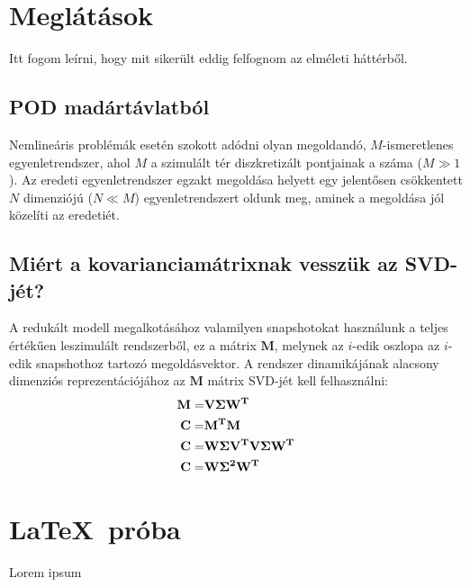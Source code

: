 \author{Szilágyi Gábor \\\vspace{2cm}\\ Konzulens: Dr. Bilicz Sándor}
\date{Budapest, \today}



    \maketitle
    \tableofcontents
    \section{Meglátások}
        Itt fogom leírni, hogy mit sikerült eddig felfognom az elméleti háttérből.
        \subsection{POD madártávlatból}
            Nemlineáris problémák esetén szokott adódni olyan megoldandó, $M$-ismeretlenes egyenletrendszer, ahol $M$ a szimulált tér diszkretizált pontjainak a száma ($M \gg 1$). Az eredeti egyenletrendszer egzakt megoldása helyett egy jelentősen csökkentett $N$ dimenziójú ($N \ll M$) egyenletrendszert oldunk meg, aminek a megoldása jól közelíti az eredetiét.
        \subsection{Miért a kovarianciamátrixnak vesszük az SVD-jét?}
            A redukált modell megalkotásához valamilyen snapshotokat használunk a teljes értékűen leszimulált rendszerből, ez a mátrix $\textbf{M}$, melynek az $i$-edik oszlopa az $i$-edik snapshothoz tartozó megoldásvektor\cite{Henneron14}. A rendszer dinamikájának alacsony dimenziós reprezentációjához az $\textbf{M}$ mátrix SVD-jét kell felhasználni:
            \begin{align*}
                \bf{M} =& \bf{V}\bf{\Sigma}\bf{W}^T \\
                \bf{C} =& \bf{M}^T\bf{M} \\
                \bf{C} =& \bf{W}\bf{\Sigma}\bf{V}^T\bf{V}\bf{\Sigma}\bf{W}^T \\
                \bf{C} =& \bf{W}\bf{\Sigma}^2\bf{W}^T
            \end{align*}
\section{\LaTeX~próba}
            Lorem ipsum \cite{PGD}
    
    



